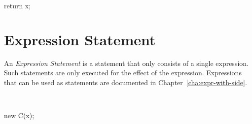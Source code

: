 \begin{absexample}
return x;
\end{absexample}

\section{Expression Statement}
An \emph{Expression Statement} is a statement that only consists of a
single expression. Such statements are only executed for the effect of
the expression.  Expressions that can be used as statements are
documented in Chapter~\ref{cha:expr-with-side}.

\begin{abssyntax}
  {}\ \TRS{;}
\end{abssyntax}

\begin{absexample}
new C(x);
\end{absexample}

